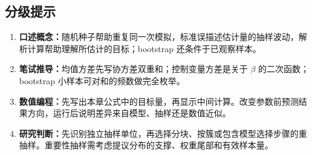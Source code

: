\subsection*{分级提示}
\begingroup\small
\begin{enumerate}[nosep,leftmargin=*]
  \item \textbf{口述概念：}随机种子帮助重复同一次模拟，标准误描述估计量的抽样波动，解析计算帮助理解所估计的目标；bootstrap 还条件于已观察样本。
  \item \textbf{笔试推导：}均值方差先写协方差双重和；控制变量方差是关于 $\beta$ 的二次函数；bootstrap 小样本可对和的频数做完全枚举。
  \item \textbf{数值编程：}先写出本章公式中的目标量，再显示中间计算。改变参数前预测结果方向，运行后说明差异来自模型、抽样还是数值近似。
  \item \textbf{研究判断：}先识别独立抽样单位，再选择分块、按簇或包含模型选择步骤的重抽样。重要性抽样需考虑提议分布的支撑、权重尾部和有效样本量。
\end{enumerate}
\endgroup

